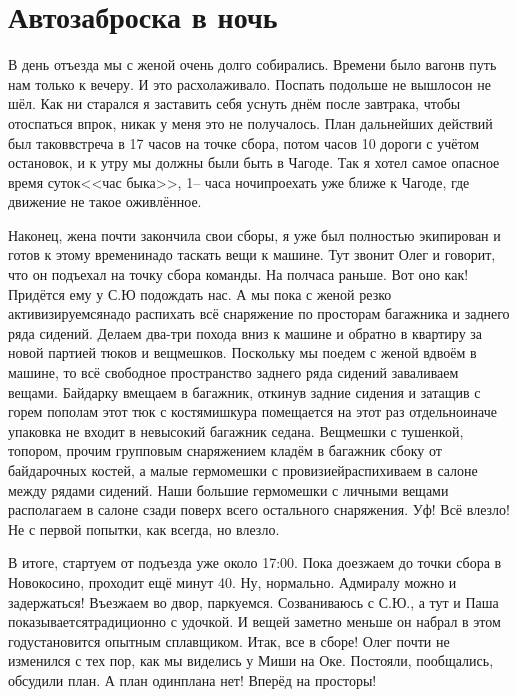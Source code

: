 \chapter{Автозаброска в ночь} 
\vepsianrose

В день отъезда мы с женой очень долго собирались. Времени было вагон\mdash в путь нам только к вечеру. И это расхолаживало. Поспать подольше не вышло\mdash сон не шёл. Как ни старался я заставить себя уснуть днём после завтрака, чтобы отоспаться впрок, никак у меня это не получалось. План дальнейших действий был таков\mdash встреча в 17 часов на точке сбора, потом часов 10 дороги с учётом остановок, и к утру мы должны были быть в Чагоде. Так я хотел самое опасное время суток\mdash <<час быка>>, 1\thinspace\nobreakdash-- часа ночи\mdash проехать уже ближе к Чагоде, где движение не такое оживлённое. 

Наконец, жена почти закончила свои сборы, я уже был полностью экипирован и готов к этому времени\mdash надо таскать вещи к машине. Тут звонит Олег и говорит, что он подъехал на точку сбора команды. На полчаса раньше. Вот оно как! Придётся ему у С.Ю подождать нас. А мы пока с женой резко активизируемся\mdash надо распихать всё снаряжение по просторам багажника и заднего ряда сидений. Делаем два-три похода вниз к машине и обратно в квартиру за новой партией тюков и вещмешков. Поскольку мы поедем с женой вдвоём в машине, то всё свободное пространство заднего ряда сидений заваливаем вещами. Байдарку вмещаем в багажник, откинув задние сидения и затащив с горем пополам этот тюк с костями\mdash шкура помещается на этот раз отдельно\mdash иначе упаковка не входит в невысокий багажник седана. Вещмешки с тушенкой, топором, прочим групповым снаряжением кладём в багажник сбоку от байдарочных костей, а малые гермомешки с провизией\mdash распихиваем в салоне между рядами сидений. Наши большие гермомешки с личными вещами располагаем в салоне сзади поверх всего остального снаряжения. Уф! Всё влезло! Не с первой попытки, как всегда, но влезло. 

В итоге, стартуем от подъезда уже около 17:00. Пока доезжаем до точки сбора в Новокосино, проходит ещё минут 40. Ну, нормально. Адмиралу можно и задержаться! Въезжаем во двор, паркуемся. Созваниваюсь с С.Ю., а тут и Паша показывается\mdash традиционно с удочкой. И вещей заметно меньше он набрал в этом году\mdash становится опытным сплавщиком. Итак, все в сборе! Олег почти не изменился с тех пор, как мы виделись у Миши на Оке. Постояли, пообщались, обсудили план. А план один\mdash плана нет! Вперёд на просторы! 

